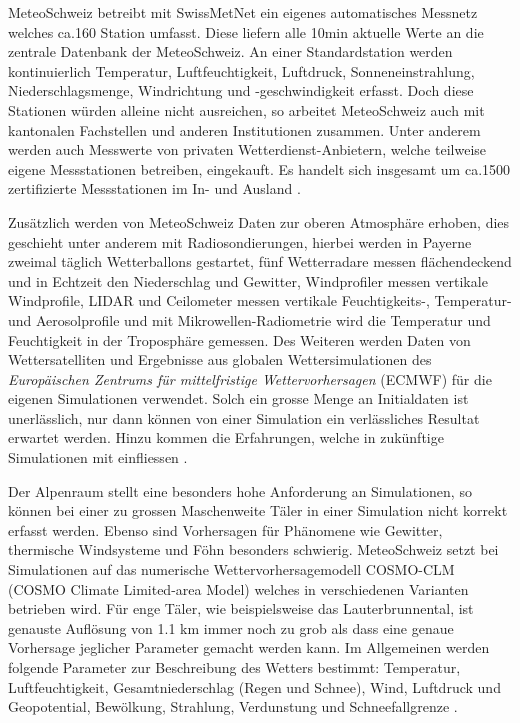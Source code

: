 \begin{refsection}
MeteoSchweiz betreibt mit SwissMetNet ein eigenes automatisches Messnetz welches ca.160 Station umfasst. Diese liefern alle 10min aktuelle Werte an die zentrale Datenbank der MeteoSchweiz. An einer Standardstation werden kontinuierlich Temperatur, Luftfeuchtigkeit, Luftdruck, Sonneneinstrahlung, Niederschlagsmenge, Windrichtung und -geschwindigkeit erfasst. Doch diese Stationen würden alleine nicht ausreichen, so arbeitet MeteoSchweiz auch mit kantonalen Fachstellen und anderen Institutionen zusammen. Unter anderem werden auch Messwerte von privaten Wetterdienst-Anbietern, welche teilweise eigene Messstationen betreiben, eingekauft. Es handelt sich insgesamt um ca.1500 zertifizierte Messstationen im In- und Ausland \cite{klima:meteoschweiz}.

Zusätzlich werden von MeteoSchweiz Daten zur oberen Atmosphäre erhoben, dies geschieht unter anderem mit Radiosondierungen, hierbei werden in Payerne zweimal täglich Wetterballons gestartet, fünf Wetterradare messen flächendeckend und in Echtzeit den Niederschlag und Gewitter, Windprofiler messen vertikale Windprofile, LIDAR und Ceilometer messen vertikale Feuchtigkeits-, Temperatur- und Aerosolprofile und mit Mikrowellen-Radiometrie wird die  Temperatur und Feuchtigkeit in der Troposphäre gemessen. Des Weiteren werden Daten von Wettersatelliten und Ergebnisse aus globalen Wettersimulationen des {\em Europäischen Zentrums für mittelfristige Wettervorhersagen} (ECMWF) für die eigenen Simulationen verwendet. Solch ein grosse Menge an Initialdaten ist unerlässlich, nur dann können von einer Simulation ein verlässliches Resultat erwartet werden. Hinzu kommen die Erfahrungen, welche in zukünftige Simulationen mit einfliessen \cite{klima:meteoschweiz}.

Der Alpenraum stellt eine besonders hohe Anforderung an Simulationen, so können bei einer zu grossen Maschenweite Täler in einer Simulation nicht korrekt erfasst werden. Ebenso sind Vorhersagen  für Phänomene wie Gewitter, thermische Windsysteme und Föhn besonders schwierig. MeteoSchweiz setzt bei Simulationen auf das numerische Wettervorhersagemodell COSMO-CLM (COSMO Climate Limited-area Model) welches in verschiedenen Varianten betrieben wird. Für enge Täler, wie beispielsweise das Lauterbrunnental, ist genauste Auflösung von 1.1 km immer noch zu grob als dass eine genaue Vorhersage jeglicher Parameter gemacht werden kann.
Im Allgemeinen werden folgende Parameter zur Beschreibung des Wetters bestimmt: Temperatur, Luftfeuchtigkeit, Gesamtniederschlag (Regen und Schnee), Wind, Luftdruck und Geopotential, Bewölkung, Strahlung, Verdunstung und Schneefallgrenze \cite{klima:tagi1} \cite{klima:tagi2}.


\end{refsection}
